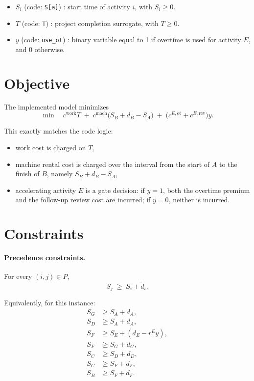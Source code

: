 \begin{itemize}
    \item $S_i$ (code: \texttt{S[a]}) : start time of activity $i$, with $S_i \ge 0$.
    \item $T$ (code: \texttt{T}) : project completion surrogate, with $T \ge 0$.
    \item $y$ (code: \texttt{use\_ot}) : binary variable equal to 1 if overtime is used for activity $E$, and 0 otherwise.
\end{itemize}

\section*{Objective}

The implemented model minimizes
\[
\min \quad
c^{\text{work}} T
\;+\;
c^{\text{mach}} \bigl(S_B + d_B - S_A\bigr)
\;+\;
\bigl(c^{E,\text{ot}} + c^{E,\text{rev}}\bigr)y.
\]

This exactly matches the code logic:
\begin{itemize}
    \item work cost is charged on $T$,
    \item machine rental cost is charged over the interval from the start of $A$ to the finish of $B$, namely $S_B + d_B - S_A$,
    \item accelerating activity $E$ is a gate decision: if $y=1$, both the overtime premium and the follow-up review cost are incurred; if $y=0$, neither is incurred.
\end{itemize}

\section*{Constraints}

\paragraph{Precedence constraints.}
For every $(i,j)\in P$,
\[
S_j \;\ge\; S_i + \tilde d_i.
\]

Equivalently, for this instance:
\[
\begin{aligned}
S_G &\ge S_A + d_A,\\
S_D &\ge S_A + d_A,\\
S_F &\ge S_E + (d_E-r^E y),\\
S_F &\ge S_G + d_G,\\
S_C &\ge S_D + d_D,\\
S_C &\ge S_F + d_F,\\
S_B &\ge S_F + d_F.
\end{aligned}
\]

